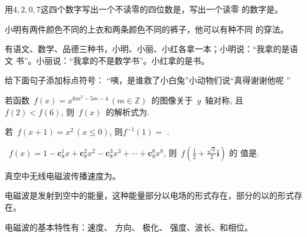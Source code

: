 
\begin{question}
用$4,2,0,7$这四个数字写出一个不读零的四位数是，写出一个读零
  的数字是。
\end{question}


\begin{question}
小明有两件颜色不同的上衣和两条颜色不同的裤子，他可以有种不同
    的穿法。
\end{question}

\begin{question}
有语文、数学、品德三种书，小明、小丽、小红各拿一本；小明说：“我拿的是语文
  书”。小丽说：“我拿的不是数学书”。小红拿的是书。
\end{question}

\begin{question}
给下面句子添加标点符号：
  “咦，是谁救了小白兔”小动物们说“真得谢谢他呢 ”
\end{question}


\begin{question}
 若函数~$f(x)=x^{6m^2-5m-4}\,(m\in\mathbb{Z})$~的图像关于~$y$~轴对称,
  且~$f(2)<f(6)$, 则~$f(x)$~的解析式为.
\end{question}

\begin{question}
若~$f(x+1)=x^2\,(x\leq0)$, 则$f^{-1}(1)=$ .
\end{question}

\begin{question} ~$f(x)=1-\textbf{c}_8^1x+\textbf{c}_8^2x^2-\textbf{c}_8^3x^3+\cdots+\textbf{c}_8^8x^8$,
  则~$f\left(\tfrac{1}{2}+\tfrac{\sqrt{3}}{2}\textbf{i}\right)$ 的
  值是.
\end{question}

\begin{question}
真空中无线电磁波传播速度为。	
\end{question}

\begin{question}
电磁波是发射到空中的能量，这种能量部分以电场的形式存在，部分的以的形式存在。	
\end{question}

\begin{question}
电磁波的基本特性有：速度、 方向、 极化、 强度、波长、和相位。	
\end{question}


